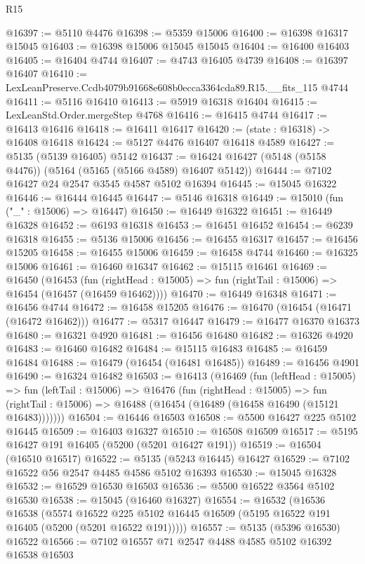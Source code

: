 \begin{lexlean}{R15}
\begin{coremodule}
{{{{{{{{{{{@16397 := @5110 @4476
@16398 := @5359 @15006
@16400 := @16398 @16317 @15045
@16403 := @16398 @15006 @15045 @15045
@16404 := @16400 @16403
@16405 := @16404 @4744
@16407 := @4743 @16405 @4739
@16408 := @16397 @16407
@16410 := LexLeanPreserve.Ccdb4079b91668e608b0ecca3364cda89.R15.__fits_115 @4744
@16411 := @5116 @16410
@16413 := @5919 @16318 @16404
@16415 := LexLeanStd.Order.mergeStep @4768
@16416 := @16415 @4744
@16417 := @16413 @16416
@16418 := @16411 @16417
@16420 := (state : @16318) -> @16408 @16418
@16424 := @5127 @4476 @16407 @16418 @4589
@16427 := @5135 (@5139 @16405) @5142
@16437 := @16424 @16427 (@5148 (@5158 @4476)) (@5164 (@5165 (@5166 @4589) @16407 @5142))
@16444 := @7102 @16427 @24 @2547 @3545 @4587 @5102 @16394
@16445 := @15045 @16322
@16446 := @16444 @16445
@16447 := @5146 @16318
@16449 := @15010 (fun ("_" : @15006) => @16447)
@16450 := @16449 @16322
@16451 := @16449 @16328
@16452 := @6193 @16318
@16453 := @16451 @16452
@16454 := @6239 @16318
@16455 := @5136 @15006
@16456 := @16455 @16317
@16457 := @16456 @15205
@16458 := @16455 @15006
@16459 := @16458 @4744
@16460 := @16325 @15006
@16461 := @16460 @16347
@16462 := @15115 @16461
@16469 := @16450
    (@16453
      (fun (rightHead : @15005) => fun (rightTail : @15006) => @16454 (@16457 (@16459 @16462))))
@16470 := @16449 @16348
@16471 := @16456 @4744
@16472 := @16458 @15205
@16476 := @16470 (@16454 (@16471 (@16472 @16462)))
@16477 := @5317 @16447
@16479 := @16477 @16370 @16373
@16480 := @16321 @4920
@16481 := @16456 @16480
@16482 := @16326 @4920
@16483 := @16460 @16482
@16484 := @15115 @16483
@16485 := @16459 @16484
@16488 := @16479 (@16454 (@16481 @16485))
@16489 := @16456 @4901
@16490 := @16324 @16482
@16503 := @16413
    (@16469
      (fun (leftHead : @15005) =>
      fun (leftTail : @15006) =>
      @16476
        (fun (rightHead : @15005) =>
        fun (rightTail : @15006) => @16488 (@16454 (@16489 (@16458 @16490 (@15121 @16483)))))))
@16504 := @16446 @16503
@16508 := @5500 @16427 @225 @5102 @16445
@16509 := @16403 @16327
@16510 := @16508 @16509
@16517 := @5195 @16427 @191 @16405 (@5200 (@5201 @16427 @191))
@16519 := @16504 (@16510 @16517)
@16522 := @5135 (@5243 @16445) @16427
@16529 := @7102 @16522 @56 @2547 @4485 @4586 @5102 @16393
@16530 := @15045 @16328
@16532 := @16529 @16530 @16503
@16536 := @5500 @16522 @3564 @5102 @16530
@16538 := @15045 (@16460 @16327)
@16554 := @16532
    (@16536
      @16538
      (@5574
        @16522
        @225
        @5102
        @16445
        @16509
        (@5195 @16522 @191 @16405 (@5200 (@5201 @16522 @191)))))
@16557 := @5135 (@5396 @16530) @16522
@16566 := @7102 @16557 @71 @2547 @4488 @4585 @5102 @16392 @16538 @16503
}}}}}}}}}}}
\end{coremodule}
\end{lexlean}
